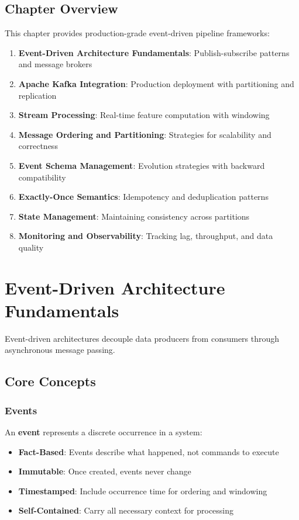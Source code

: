 \subsection{Chapter Overview}

This chapter provides production-grade event-driven pipeline frameworks:

\begin{enumerate}
    \item \textbf{Event-Driven Architecture Fundamentals}: Publish-subscribe patterns and message brokers
    \item \textbf{Apache Kafka Integration}: Production deployment with partitioning and replication
    \item \textbf{Stream Processing}: Real-time feature computation with windowing
    \item \textbf{Message Ordering and Partitioning}: Strategies for scalability and correctness
    \item \textbf{Event Schema Management}: Evolution strategies with backward compatibility
    \item \textbf{Exactly-Once Semantics}: Idempotency and deduplication patterns
    \item \textbf{State Management}: Maintaining consistency across partitions
    \item \textbf{Monitoring and Observability}: Tracking lag, throughput, and data quality
\end{enumerate}

\section{Event-Driven Architecture Fundamentals}

Event-driven architectures decouple data producers from consumers through asynchronous message passing.

\subsection{Core Concepts}

\subsubsection{Events}

An \textbf{event} represents a discrete occurrence in a system:
\begin{itemize}
    \item \textbf{Fact-Based}: Events describe what happened, not commands to execute
    \item \textbf{Immutable}: Once created, events never change
    \item \textbf{Timestamped}: Include occurrence time for ordering and windowing
    \item \textbf{Self-Contained}: Carry all necessary context for processing
\end{itemize}

